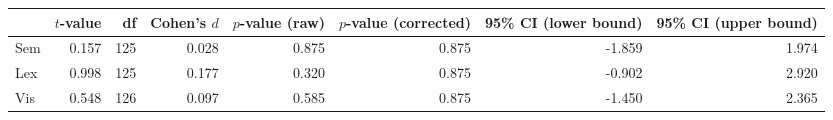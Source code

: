 \begin{tabular}{lrrrrrrr}
\toprule
{} & $t$-value &  df & Cohen's $d$ & $p$-value (raw) & $p$-value (corrected) & 95\% CI (lower bound) & 95\% CI (upper bound) \\
\midrule
Sem &     0.157 & 125 &       0.028 &           0.875 &                 0.875 &                -1.859 &                 1.974 \\
Lex &     0.998 & 125 &       0.177 &           0.320 &                 0.875 &                -0.902 &                 2.920 \\
Vis &     0.548 & 126 &       0.097 &           0.585 &                 0.875 &                -1.450 &                 2.365 \\
\bottomrule
\end{tabular}
